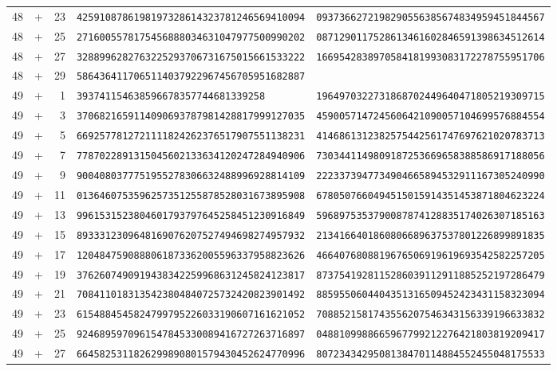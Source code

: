 \begin{longtable}{@{}rcrll@{}}
48&+&23&\texttt{4259108786198197328614323781246569410094}&\texttt{0937366272198290556385674834959451844567}\\
48&+&25&\texttt{2716005578175456888034631047977500990202}&\texttt{0871290117528613461602846591398634512614}\\
48&+&27&\texttt{3288996282763225293706731675015661533222}&\texttt{1669542838970584181993083172278755951706}\\
48&+&29&\texttt{5864364117065114037922967456705951682887}&\texttt{}\\
49&+&1&\texttt{393741154638596678357744681339258}&\texttt{1964970322731868702449640471805219309715}\\
49&+&3&\texttt{3706821659114090693787981428817999127035}&\texttt{4590057147245606421090057104699576884554}\\
49&+&5&\texttt{6692577812721111824262376517907551138231}&\texttt{4146861312382575442561747697621020783713}\\
49&+&7&\texttt{7787022891315045602133634120247284940906}&\texttt{7303441149809187253669658388586917188056}\\
49&+&9&\texttt{9004080377751955278306632488996928814109}&\texttt{2223373947734904665894532911167305240990}\\
49&+&11&\texttt{0136460753596257351255878528031673895908}&\texttt{6780507660494515015914351453871804623224}\\
49&+&13&\texttt{9961531523804601793797645258451230916849}&\texttt{5968975353790087874128835174026307185163}\\
49&+&15&\texttt{8933312309648169076207527494698274957932}&\texttt{2134166401860806689637537801226899891835}\\
49&+&17&\texttt{1204847590888061873362005596337958823626}&\texttt{4664076808819676506919619693542582257205}\\
49&+&19&\texttt{3762607490919438342259968631245824123817}&\texttt{8737541928115286039112911885252197286479}\\
49&+&21&\texttt{7084110183135423804840725732420823901492}&\texttt{8859550604404351316509452423431158323094}\\
49&+&23&\texttt{6154884545824799795226033190607161621052}&\texttt{7088521581743556207546343156339196633832}\\
49&+&25&\texttt{9246895970961547845330089416727263716897}&\texttt{0488109988665967799212276421803819209417}\\
49&+&27&\texttt{6645825311826299890801579430452624770996}&\texttt{8072343429508138470114884552455048175533}\\

\end{longtable}
